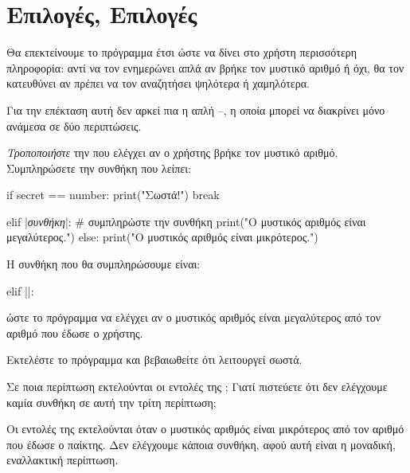 \documentclass[a4paper,11pt,oneside]{book}
\begin{document}
\section{Επιλογές, Επιλογές}

Θα επεκτείνουμε το πρόγραμμα έτσι ώστε να δίνει στο χρήστη περισσότερη πληροφορία: αντί να τον ενημερώνει απλά αν βρήκε τον μυστικό αριθμό ή όχι, θα τον κατευθύνει αν πρέπει να τον αναζητήσει ψηλότερα ή χαμηλότερα.

Για την επέκταση αυτή δεν αρκεί πια η απλή --, η οποία μπορεί να διακρίνει μόνο ανάμεσα σε δύο περιπτώσεις. 

\begin{step}
\emph{Τροποποιήστε} την  που ελέγχει αν ο χρήστης βρήκε τον μυστικό αριθμό. Συμπληρώσετε την συνθήκη που λείπει:

\begin{pyplain}
    if secret == number:
        print("Σωστά!")
        break
\end{pyplain}
\begin{pynew}
    elif |\textrm{\textit{συνθήκη}}|: # συμπληρώστε την συνθήκη
        print("Ο μυστικός αριθμός είναι μεγαλύτερος.")
    else:
        print("Ο μυστικός αριθμός είναι μικρότερος.")
\end{pynew}

\begin{answer}[]
Η συνθήκη που θα συμπληρώσουμε είναι:

\begin{pyplain}
elif ||:
\end{pyplain}

ώστε το πρόγραμμα να ελέγχει αν ο μυστικός αριθμός είναι μεγαλύτερος από τον αριθμό που έδωσε ο χρήστης.
\end{answer}

Εκτελέστε το πρόγραμμα και βεβαιωθείτε ότι λειτουργεί σωστά. 

Σε ποια περίπτωση εκτελούνται οι εντολές της ; Γιατί πιστεύετε ότι δεν ελέγχουμε καμία συνθήκη σε αυτή την τρίτη περίπτωση;

\clearpage
\begin{answer}
	Οι εντολές της  εκτελούνται όταν ο μυστικός αριθμός είναι μικρότερος από τον αριθμό που έδωσε ο παίκτης. Δεν ελέγχουμε κάποια συνθήκη, αφού αυτή είναι η μοναδική, εναλλακτική περίπτωση.
\end{answer}
\end{step}
\end{document}
